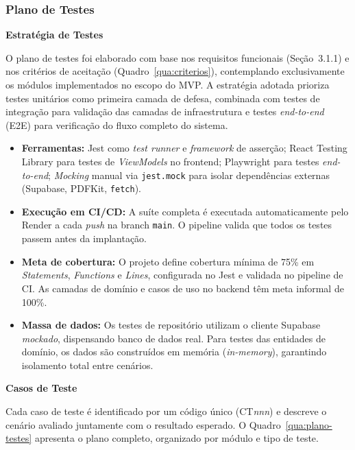 \subsubsection{Plano de Testes}

\textbf{Estratégia de Testes}

O plano de testes foi elaborado com base nos requisitos funcionais (Seção~3.1.1) e nos critérios de aceitação (Quadro~\ref{qua:criterios}), contemplando exclusivamente os módulos implementados no escopo do MVP. A estratégia adotada prioriza testes unitários como primeira camada de defesa, combinada com testes de integração para validação das camadas de infraestrutura e testes \textit{end-to-end} (E2E) para verificação do fluxo completo do sistema.

\begin{itemize}
    \item \textbf{Ferramentas:} Jest como \textit{test runner} e \textit{framework} de asserção; React Testing Library para testes de \textit{ViewModels} no frontend; Playwright para testes \textit{end-to-end}; \textit{Mocking} manual via \texttt{jest.mock} para isolar dependências externas (Supabase, PDFKit, \texttt{fetch}).
    \item \textbf{Execução em CI/CD:} A suíte completa é executada automaticamente pelo Render a cada \textit{push} na branch \texttt{main}. O pipeline valida que todos os testes passem antes da implantação.
    \item \textbf{Meta de cobertura:} O projeto define cobertura mínima de 75\% em \textit{Statements}, \textit{Functions} e \textit{Lines}, configurada no Jest e validada no pipeline de CI. As camadas de domínio e casos de uso no backend têm meta informal de 100\%.
    \item \textbf{Massa de dados:} Os testes de repositório utilizam o cliente Supabase \textit{mockado}, dispensando banco de dados real. Para testes das entidades de domínio, os dados são construídos em memória (\textit{in-memory}), garantindo isolamento total entre cenários.
\end{itemize}

\textbf{Casos de Teste}

Cada caso de teste é identificado por um código único (CT\textit{nnn}) e descreve o cenário avaliado juntamente com o resultado esperado. O Quadro~\ref{qua:plano-testes} apresenta o plano completo, organizado por módulo e tipo de teste.

